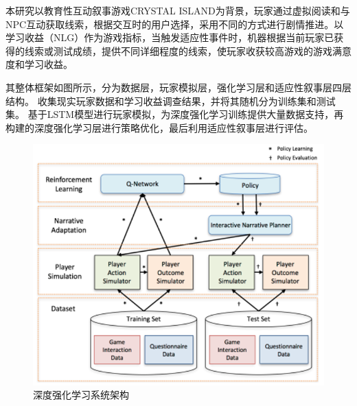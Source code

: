 \documentclass[12pt]{article}
\begin{document}
            本研究以教育性互动叙事游戏CRYSTAL ISLAND为背景，玩家通过虚拟阅读和与NPC互动获取线索，根据交互时的用户选择，采用不同的方式进行剧情推进。以学习收益（NLG）作为游戏指标，当触发适应性事件时，机器根据当前玩家已获得的线索或测试成绩，提供不同详细程度的线索，使玩家收获较高游戏的游戏满意度和学习收益。
            
            其整体框架如图所示，分为数据层，玩家模拟层，强化学习层和适应性叙事层四层结构。
            收集现实玩家数据和学习收益调查结果，并将其随机分为训练集和测试集。
            基于LSTM模型进行玩家模拟，为深度强化学习训练提供大量数据支持，再构建的深度强化学习层进行策略优化，最后利用适应性叙事层进行评估。
            \begin{figure}[H]
            	
            	\centering
            	\includegraphics[scale=0.5]{images/RL_architecture.png}
            	\caption{深度强化学习系统架构}
            	\label{fig:label}
            \end{figure}
\end{document}
